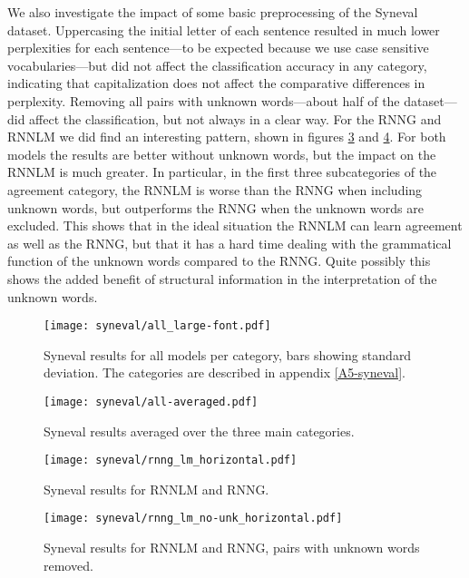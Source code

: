     We also investigate the impact of some basic preprocessing of the Syneval dataset. Uppercasing the initial letter of each sentence resulted in much lower perplexities for each sentence---to be expected because we use case sensitive vocabularies---but did not affect the classification accuracy in any category, indicating that capitalization does not affect the comparative differences in perplexity. Removing all pairs with unknown words---about half of the dataset---did affect the classification, but not always in a clear way. For the RNNG and RNNLM we did find an interesting pattern, shown in figures \ref{fig:syneval-lm-rnng} and \ref{fig:syneval-lm-rnng-nounk}. For both models the results are better without unknown words, but the impact on the RNNLM is much greater. In particular, in the first three subcategories of the agreement category, the RNNLM is worse than the RNNG when including unknown words, but outperforms the RNNG when the unknown words are excluded. This shows that in the ideal situation the RNNLM can learn agreement as well as the RNNG, but that it has a hard time dealing with the grammatical function of the unknown words compared to the RNNG. Quite possibly this shows the added benefit of structural information in the interpretation of the unknown words.

      \begin{figure}[h]
        \center
        \texttt{[image: syneval/all\_large-font.pdf]}
      \caption{Syneval results for all models per category, bars showing standard deviation. The categories are described in appendix \ref{A5-syneval}.}
      \label{fig:syneval-all}
      \end{figure}
    \restoregeometry

    \begin{figure}[h]
      \center
      \texttt{[image: syneval/all-averaged.pdf]}
    \caption{Syneval results averaged over the three main categories.}
    \label{fig:syneval-all-averaged}
    \end{figure}

    \begin{figure}[h]
      \center
      \texttt{[image: syneval/rnng\_lm\_horizontal.pdf]}
    \caption{Syneval results for RNNLM and RNNG.}
    \label{fig:syneval-lm-rnng}
    \end{figure}

    \begin{figure}[h]
      \center
      \texttt{[image: syneval/rnng\_lm\_no-unk\_horizontal.pdf]}
    \caption{Syneval results for RNNLM and RNNG, pairs with unknown words removed.}
    \label{fig:syneval-lm-rnng-nounk}
    \end{figure}

